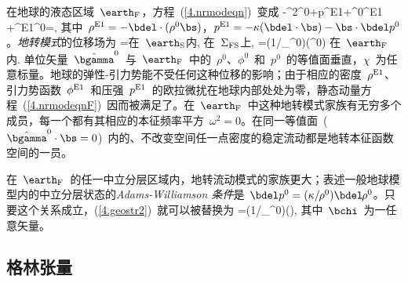 在地球的液态区域~$\earth_{\rm F}$，方程~(\ref{4.nrmodeqn})~变成
\eq
\label{4.nrmodeqnF}
-\omega^2\rho^0\bs+\bdel p^{\rm E1}+\rho^0\bdel\phi^{\rm E1}
+\rho^{\rm E1}\bdel\phi^0=\bzero,
\en
其中~$\rho^{\rm E1}=-\bdel\cdot(\rho^0\bs)$，$p^{\rm E1}=-\kappa(\bdel\cdot\bs)-\bs\cdot\bdel p^0$。{\em 地转模式\/}的位移场为
\eq
\label{4.geostr1}
\bs=\bzero\quad\mbox{在 $\earth_{\rm S}$内},
\en
\eq
\bnh\cdot{}\quad\mbox{在 $\Sigma_{\rm FS}$上},
\en
\eq
\label{4.geostr2}
\bs=(1/_{\!}\rho^0)(\hat{\bgamma}^0\times\bdel\chi)
\quad\mbox{在 $\earth_{\rm F}$内}.
\en
单位矢量~$\hat{\bgamma}^0$~与~$\earth_{\rm F}$~中的~$\rho^0$、$\phi^0$~和~$p^0$~的等值面垂直，$\chi$~为任意标量。地球的弹性-引力势能不受任何这种位移的影响；由于相应的密度~$\rho^{\rm E1}$、引力势函数~$\phi^{\rm E1}$~和压强~$p^{\rm E1}$~的欧拉微扰在地球内部处处为零，静态动量方程~(\ref{4.nrmodeqnF})~因而被满足了。在~$\earth_{\rm F}$~中这种地转模式家族有无穷多个成员，每一个都有其相应的本征频率平方~$\omega^2=0$。在同一等值面~($\hat{\bgamma}^0\cdot\bs=0$)~内的、不改变空间任一点密度的稳定流动都是地转本征函数空间的一员。

在~$\earth_{\rm F}$~的任一中立分层区域内，地转流动模式的家族更大；表述一般地球模型内的中立分层状态的{\em Adams-Williamson 条件\/}是~$\bdel p^0=(\kappa/\hspace{-0.3 mm}\rho^0)\bdel_{\!}\rho^0$。只要这个关系成立，(\ref{4.geostr2})~就可以被替换为
%
\eq
\label{4.geostr4}
\bs=(1/_{\!}\rho^0)(\bdel\times\bchi),
\en
其中~$\bchi$~为一任意矢量。
%
%
%
%
%
%

\subsection{格林张量}
%
%
\label{4.sec.nrGreen}

